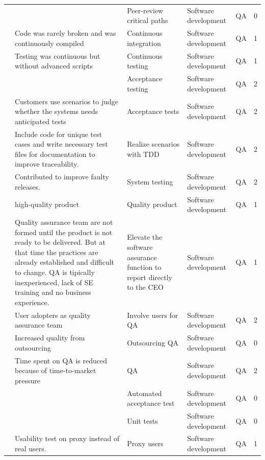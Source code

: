 \documentclass[final,5p,times,twocolumn]{elsarticle}
\begin{document}
\begin{center}
\begin{longtable}{|p{0.36in}|p{2.6in}|p{1.2in}|p{0.9in}|p{0.9in}|p{0.2in}|}
\cite{Taipale2010} &       & Peer-review critical paths & Software development & QA    & 0 \\
\cite{Tingling2007} & Code was rarely broken and was continuously compiled & Continuous integration & Software development & QA    & 1 \\
\cite{Tingling2007} & Testing was continuous but without advanced scripts & Continuous testing & Software development & QA    & 1 \\
\cite{Kajko-Mattsson2008} &       & Acceptance testing & Software development & QA    & 2 \\
\cite{Zettel2001} & Customers use scenarios to judge whether the systems needs anticipated tests & Acceptance tests & Software development & QA    & 2 \\
\cite{Zettel2001} & Include code for unique test cases and write necessary test files for documentation to improve traceability. & Realize scenarios with TDD & Software development & QA    & 2 \\
\cite{Kajko-Mattsson2008} & Contributed to improve faulty releases. & System testing & Software development & QA    & 2 \\
\cite{Deakins2005} & high-quality product & Quality product & Software development & QA    & 1 \\
\cite{Mater2000} & Quality assurance team are not formed until the product is not ready to be delivered. But at that time the practices are already established and difficult to change. QA is tipically inexperienced, lack of SE training and no business experience. & Elevate the software assurance function to report directly to the CEO & Software development & QA    & 1 \\
\cite{Yoffie1999} & User adopters as quality assurance team & Involve users for QA & Software development & QA    & 2 \\
\cite{Mater2000} & Increased quality from outsourcing & Outsourcing QA & Software development & QA    & 0 \\
\cite{Zettel2001} & Time spent on QA is reduced because of time-to-market pressure & QA    & Software development & QA    & 2 \\
\cite{Taipale2010} &       & Automated acceptance test & Software development & QA    & 0 \\
\cite{Taipale2010} &       & Unit tests & Software development & QA    & 0 \\
\cite{Mirel2000} & Usability test on proxy instead of real users.  & Proxy users & Software development & QA    & 1 \\

\end{longtable}
\end{center}
\end{document}
